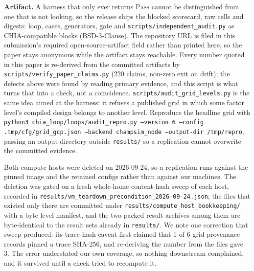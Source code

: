\documentclass[10pt,twocolumn]{article}
\begin{document}
\textbf{Artifact.} A harness that only ever returns \textsc{Pass} cannot be
distinguished from one that is not looking, so the release ships the blocked
scorecard, raw cells and digests: loop, cases, generators, gate and
\texttt{scripts/independent\_audit.py} as CHIA-compatible blocks (BSD-3-Clause). The
repository URL is filed in this submission's required open-source-artifact field
rather than printed here, so the paper stays anonymous while the artifact stays
reachable. Every number quoted in this paper
is re-derived from the committed artifacts by
\texttt{scripts/verify\_paper\_claims.py} (220 claims, non-zero exit on drift); the
defects above were found by reading primary evidence, and this script is what turns
that into a check, not a coincidence. \texttt{scripts/audit\_grid\_levels.py}
is the same idea aimed at the harness: it refuses a published grid in which some factor
level's compiled design belongs to another level. Reproduce the headline grid with
\texttt{python3 chia\_loop/loops/audit\_repro.py --version 6 --config
.tmp/cfg/grid\_gcp.json --backend champsim\_node --output-dir /tmp/repro}, passing an
output directory outside \texttt{results/} so a replication cannot overwrite the
committed evidence.

Both compute hosts were deleted on 2026-09-24, so a replication runs against the pinned
image and the retained configs rather than against our machines. The deletion was gated
on a fresh whole-home content-hash sweep of each host, recorded in
\texttt{results/vm\_teardown\_precondition\_2026-09-24.json}; the files that existed only
there are committed under \texttt{results/compute\_host\_bookkeeping/} with a byte-level
manifest, and the two packed result archives among them are byte-identical to the result
sets already in \texttt{results/}. We note one correction that sweep produced: its
trace-hash caveat first claimed that 1 of 6 grid provenance records pinned a trace
SHA-256, and re-deriving the number from the files gave 3. The error understated our own
coverage, so nothing downstream complained, and it survived until a check tried to
recompute it.
\end{document}
